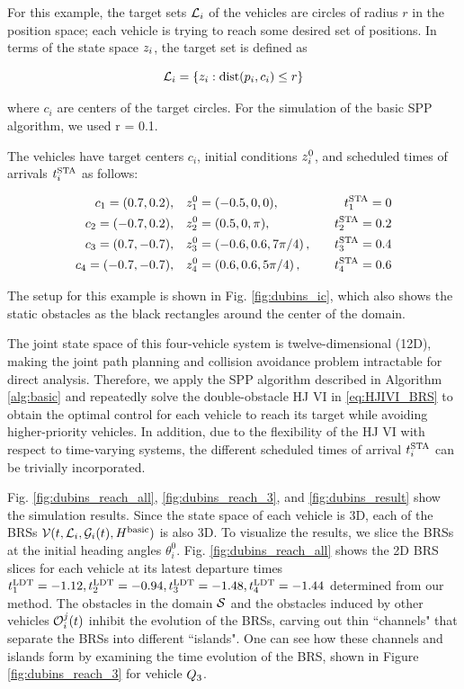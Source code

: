 For this example, the target sets $\mathcal{L}_i$ of the vehicles are circles of radius $r$ in the position space; each vehicle is trying to reach some desired set of positions. In terms of the state space $z_i$, the target set is defined as

\begin{equation}
\label{eq:target_sim}
\targetset_i = \{z_i: \dist(p_i, c_i) \le r\}
\end{equation}

\noindent where $c_i$ are centers of the target circles. For the simulation of the basic SPP algorithm, we used r = 0.1.

The vehicles have target centers $c_i$, initial conditions $z_i^0$, and scheduled times of arrivals $t^\text{STA}_i$ as follows:

\begin{equation}
\begin{aligned}
c_1 = (0.7, 0.2), \quad& z_1^0 = (-0.5, 0, 0), \quad & t^\text{STA}_1 = 0 \\
c_2 = (-0.7, 0.2), \quad& z_2^0 = (0.5, 0, \pi), \quad & t^\text{STA}_2 = 0.2 \\
c_3 = (0.7, -0.7), \quad& z_3^0 = \left(-0.6, 0.6, 7\pi/4\right), \quad & t^\text{STA}_3 = 0.4\\
c_4 = (-0.7, -0.7), \quad & z_4^0 = \left(0.6, 0.6, 5\pi/4\right), \quad & t^\text{STA}_4 = 0.6
\end{aligned}
\end{equation}

The setup for this example is shown in Fig. \ref{fig:dubins_ic}, which also shows the static obstacles as the black rectangles around the center of the domain.

The joint state space of this four-vehicle system is twelve-dimensional (12D), making the joint path planning and collision avoidance problem intractable for direct analysis. Therefore, we apply the SPP algorithm described in Algorithm \ref{alg:basic} and repeatedly solve the double-obstacle HJ VI in \eqref{eq:HJIVI_BRS} to obtain the optimal control for each vehicle to reach its target while avoiding higher-priority vehicles. In addition, due to the flexibility of the HJ VI with respect to time-varying systems, the different scheduled times of arrival $t^\text{STA}_i$ can be trivially incorporated. 

Fig. \ref{fig:dubins_reach_all}, \ref{fig:dubins_reach_3}, and \ref{fig:dubins_result} show the simulation results. Since the state space of each vehicle is 3D, each of the BRSs $\mathcal{V}(t, \mathcal{L}_i, \mathcal{G}_i(t), H^\text{basic})$ is also 3D. To visualize the results, we slice the BRSs at the initial heading angles $\theta_i^0$. Fig. \ref{fig:dubins_reach_all} shows the 2D BRS slices for each vehicle at its latest departure times $t^\text{LDT}_1=-1.12, t^\text{LDT}_2=-0.94,t^\text{LDT}_3=-1.48,t^\text{LDT}_4=-1.44$ determined from our method. The obstacles in the domain $\mathcal{S}$ and the obstacles induced by other vehicles $\mathcal{O}_i^j(t)$ inhibit the evolution of the BRSs, carving out thin ``channels" that separate the BRSs into different ``islands". One can see how these channels and islands form by examining the time evolution of the BRS, shown in Figure \ref{fig:dubins_reach_3} for vehicle $Q_3$. 

